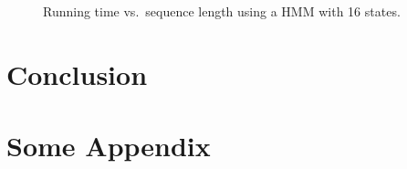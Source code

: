 \documentclass[11pt,twoside,a4,danish,english,report]{memoir}
\begin{document}
\begin{figure}[H]
  \centering
  
  \caption{Running time vs.\ sequence length using a HMM with 16 states.}
  \label{fig:speedup_vs_sequence_length}
\end{figure}

\chapter{Conclusion}
\label{cha:conclusion}

\appendix{}

\chapter{Some Appendix}
\label{cha:some-appendix}

\backmatter{}


\end{document}
